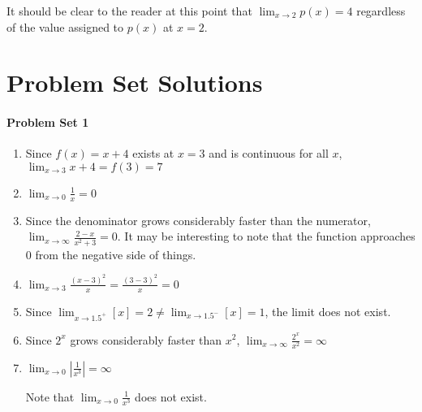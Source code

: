 \documentclass[10pt,a4paper]{book}
\begin{document}
It should be clear to the reader at this point that $\displaystyle\lim_{x \to 2} p(x) = 4$ regardless of the value assigned to $p(x)$ at $x=2$.

\chapter{Problem Set Solutions}
\newpage
\begin{multicols}{2}
\subsubsection*{Problem Set 1}
\begin{enumerate}
	\item Since $f(x)=x+4$ exists at $x=3$ and is continuous for all $x$, $\displaystyle \lim_{x \to 3} {x+4} = f(3) = 7$
    \item $\displaystyle \lim_{x \to 0} {\frac{1}{x}} = 0$
    \item Since the denominator grows considerably faster than the numerator, $\displaystyle \lim_{x \to \infty} {\frac{2-x}{x^{2}+3}} = 0$. It may be interesting to note that the function approaches 0 from the negative side of things.
    \item $\displaystyle \lim_{x \to 3} {\frac{\left(x-3\right)^{2}}{x}} = {\frac{\left(3-3\right)^{2}}{x}} = 0$
    \item Since $\displaystyle \lim_{x \to 1.5^{+}} {\left[x\right]} = 2 \neq \lim_{x \to 1.5^{-}} {\left[x\right]} = 1$, the limit does not exist.
    
    \item Since $2^{x}$ grows considerably faster than $x^{2}$, $\displaystyle \lim_{x \to \infty} {\frac{2^{x}}{x^{2}}} = \infty$
    
    \item $\displaystyle \lim_{x \to 0} {\left|\frac{1}{x^{3}}\right|} = \infty$
    
    Note that $\displaystyle \lim_{x \to 0} {\frac{1}{x^{3}}}$ does not exist.
\end{enumerate}
\end{multicols}
\end{document}

